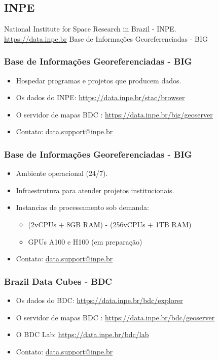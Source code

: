 \subsection{INPE}

\begin{frame}
	National Institute for Space Research in Brazil - INPE.\\
	\url{https://data.inpe.br}
	Base de Informações Georeferenciadas - BIG
\end{frame}

\begin{frame}
	\frametitle{Base de Informações Georeferenciadas - BIG}
	\begin{itemize}
		\item Hospedar programas e projetos que producem dados.
		\item Os dados do INPE: \url{https://data.inpe.br/stac/browser}
		\item O servidor de mapas BDC : \url{https://data.inpe.br/big/geoserver}
		\item Contato: \href{mailto:[data.support@inpe.br]}{data.support@inpe.br}
	\end{itemize}
\end{frame}

\begin{frame}
	\frametitle{Base de Informações Georeferenciadas - BIG}
	\begin{itemize}
		\item Ambiente operacional (24/7).
		\item Infraestrutura para atender projetos institucionais.
		\item Instancias de processamento sob demanda:
		      \begin{itemize}
			      \item (2vCPUs + 8GB RAM) - (256vCPUs + 1TB RAM)
			      \item GPUs A100 e H100 (em preparação)
		      \end{itemize}
		\item Contato: \href{mailto:[data.support@inpe.br]}{data.support@inpe.br}
	\end{itemize}
\end{frame}

\begin{frame}
	\frametitle{Brazil Data Cubes - BDC}
	\begin{itemize}
		\item Os dados do BDC: \url{https://data.inpe.br/bdc/explorer}
		\item O servidor de mapas BDC : \url{https://data.inpe.br/bdc/geoserver}
		\item O BDC Lab: \url{https://data.inpe.br/bdc/lab}
		\item Contato: \href{mailto:[data.support@inpe.br]}{data.support@inpe.br}
	\end{itemize}
\end{frame}

